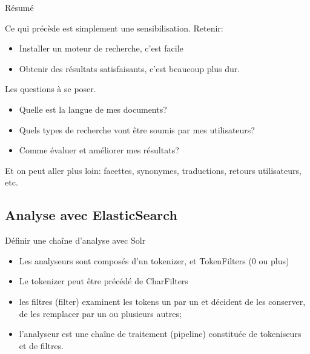 \begin{frame}{Résumé}

Ce qui précède est simplement une sensibilisation. Retenir:

\begin{itemize}
 \item Installer un moteur de recherche, \alert{c'est facile}
 \item Obtenir des résultats satisfaisants, \alert{c'est beaucoup plus dur}.
 \end{itemize}

\vfill

Les questions à se poser.

\begin{itemize}
 \item Quelle est la langue de mes documents?
 \item Quels types de recherche vont être soumis par mes utilisateurs?
 \item Comme évaluer et améliorer mes résultats?
 \end{itemize}


\vfill
\begin{blocgauche}
\alert{Et on peut aller plus loin}: facettes, synonymes, traductions, retours
utilisateurs, etc.
\end{blocgauche}

\end{frame}




\subsection{Analyse avec ElasticSearch}

\begin{frame}[fragile]{Définir une chaîne d'analyse avec Solr}

\begin{itemize}
	\item Les analyseurs sont composés d'un tokenizer, et TokenFilters (0 ou plus)
	\item Le tokenizer peut être précédé de CharFilters
	 \item les filtres (filter) examinent les tokens un par un et décident de les conserver, de les remplacer par un ou plusieurs autres;
	 \item l’analyseur est une chaîne de traitement (pipeline) constituée de tokeniseurs et de filtres.
\end{itemize}

\end{frame}

